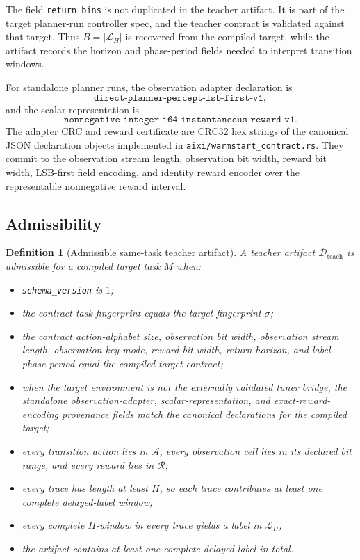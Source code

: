 \documentclass[11pt]{article}
\newtheorem{definition}{Definition}
\newcommand{\Act}{\mathcal{A}}
\newcommand{\Rspace}{\mathcal{R}}
\newcommand{\Teach}{\mathcal{D}_{\mathrm{teach}}}
\newcommand{\Lab}{\mathcal{L}_H}
\begin{document}
The field \texttt{return\_bins} is not duplicated in the teacher artifact.
It is part of the target planner-run controller spec, and the teacher contract
is validated against that target. Thus \(B=|\Lab|\) is recovered from the
compiled target, while the artifact records the horizon and phase-period
fields needed to interpret transition windows.

For standalone planner runs, the observation adapter declaration is
\[
\texttt{direct-planner-percept-lsb-first-v1},
\]
and the scalar representation is
\[
\texttt{nonnegative-integer-i64-instantaneous-reward-v1}.
\]
The adapter CRC and reward certificate are CRC32 hex strings of the canonical
JSON declaration objects implemented in
\texttt{aixi/warmstart\_contract.rs}. They commit to the observation stream
length, observation bit width, reward bit width, LSB-first field encoding, and
identity reward encoder over the representable nonnegative reward interval.

\subsection{Admissibility}

\begin{definition}[Admissible same-task teacher artifact]
\label{def:admissible-teacher}
A teacher artifact \(\Teach\) is admissible for a compiled target task \(M\)
when:
\begin{itemize}
    \item \texttt{schema\_version} is \(1\);
    \item the contract task fingerprint equals the target fingerprint
    \(\sigma\);
    \item the contract action-alphabet size, observation bit width,
    observation stream length, observation key mode, reward bit width, return
    horizon, and label phase period equal the compiled target contract;
    \item when the target environment is not the externally validated tuner
    bridge, the standalone observation-adapter, scalar-representation, and
    exact-reward-encoding provenance fields match the canonical declarations
    for the compiled target;
    \item every transition action lies in \(\Act\), every observation cell lies
    in its declared bit range, and every reward lies in \(\Rspace\);
    \item every trace has length at least \(H\), so each trace contributes at
    least one complete delayed-label window;
    \item every complete \(H\)-window in every trace yields a label in
    \(\Lab\);
    \item the artifact contains at least one complete delayed label in total.
\end{itemize}
\end{definition}
\end{document}
